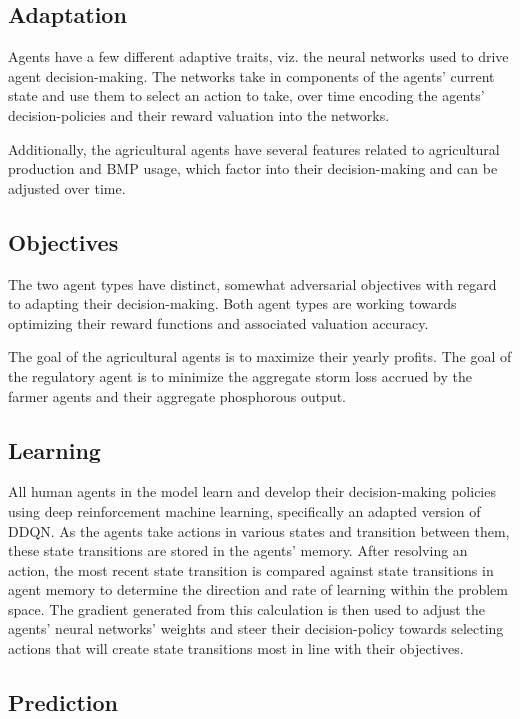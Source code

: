 \subsection{Adaptation}

Agents have a few different adaptive traits,
viz. the neural networks used to drive agent decision-making.
The networks take in components of the agents' current state 
and use them to select an action to take, 
over time encoding the agents' decision-policies 
and their reward valuation into the networks.

Additionally, 
the agricultural agents have several features related 
to agricultural production and BMP usage, 
which factor into their decision-making and can be adjusted over time.

\subsection{Objectives}
The two agent types have distinct, 
somewhat adversarial objectives with regard to adapting their 
decision-making.
Both agent types are working towards optimizing their reward functions
and associated valuation accuracy.

The goal of the agricultural agents is to maximize their yearly profits.
The goal of the regulatory agent is to minimize the aggregate storm loss
accrued by the farmer agents and their aggregate phosphorous output.

\subsection{Learning}

All human agents in the model learn and develop their decision-making 
policies using deep reinforcement machine learning,
specifically an adapted version of DDQN. 
As the agents take actions in various states and transition between them,
these state transitions are stored in the agents' memory.
After resolving an action,
the most recent state transition is compared against state transitions 
in agent memory to determine the direction 
and rate of learning within the problem space. 
The gradient generated from this calculation is then used 
to adjust the agents' neural networks' weights and 
steer their decision-policy towards selecting actions 
that will create state transitions most in line with their objectives.

\subsection{Prediction}

